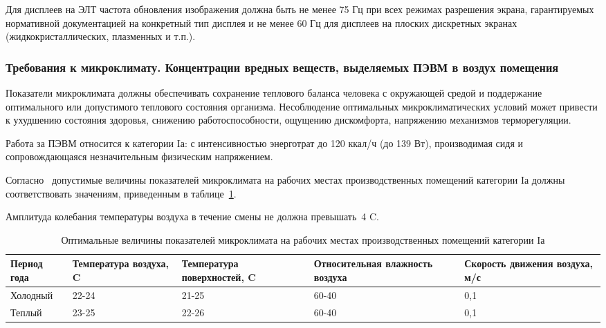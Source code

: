 Для дисплеев на ЭЛТ частота обновления изображения должна быть не менее 75 Гц при всех режимах 
разрешения экрана, гарантируемых нормативной документацией на конкретный тип дисплея и не менее 60 Гц 
для дисплеев на плоских дискретных экранах (жидкокристаллических, плазменных и т.п.).~\cite{sanpin_2.4.1340-03}


\subsubsection{Требования к микроклимату. Концентрации вредных веществ, выделяемых ПЭВМ в воздух помещения}


 Показатели микроклимата должны обеспечивать сохранение теплового баланса человека с окружающей средой и 
 поддержание оптимального или допустимого теплового состояния организма.
 Несоблюдение оптимальных микроклиматических условий может привести к ухудшению состояния здоровья,
 снижению работоспособности, ощущению дискомфорта, напряжению механизмов терморегуляции.
 
 Работа за ПЭВМ относится к категории Iа: с интенсивностью энерготрат до 120 ккал/ч (до 139 Вт), 
 производимая сидя и сопровождающаяся незначительным физическим напряжением.~\cite{sanpin_mikroclimate} 
 
 Согласно~\cite{sanpin_mikroclimate} допустимые величины показателей микроклимата на рабочих местах производственных помещений категории Iа 
 должны соответствовать значениям, приведенным в таблице~\ref{tab:climate_1}. 
 
 Амплитуда колебания температуры воздуха в течение смены не должна превышать~4\textdegree{} C.
 
\begin{table}[h!]
\caption{ Оптимальные величины показателей микроклимата на рабочих местах производственных помещений категории Iа }
\label{tab:climate_1}
\begin{center}
\begin{tabularx}{\linewidth}{|X|X|X|X|X|}
\hline
Период года & Температура воздуха, \textdegree{}C & Температура поверхностей, \textdegree{}C & Относительная влажность воздуха & Скорость движения воздуха, м/с\\
\hline
Холодный & 22-24 & 21-25 & 60-40 & 0,1\\
\hline
Теплый & 23-25 & 22-26 & 60-40 & 0,1\\
\hline
\end{tabularx}
\end{center}
\end{table}


